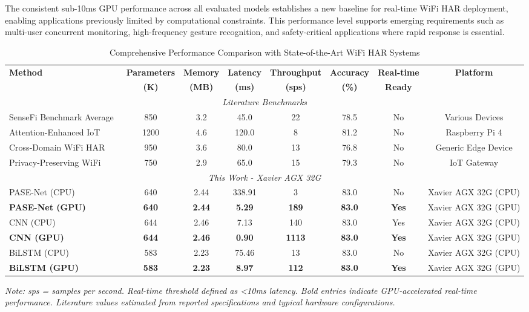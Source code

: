 The consistent sub-10ms GPU performance across all evaluated models establishes a new baseline for real-time WiFi HAR deployment, enabling applications previously limited by computational constraints. This performance level supports emerging requirements such as multi-user concurrent monitoring, high-frequency gesture recognition, and safety-critical applications where rapid response is essential.

\begin{table*}[t]
\centering
\caption{Comprehensive Performance Comparison with State-of-the-Art WiFi HAR Systems}
\label{tab:literature_performance_comparison}
\small
\begin{tabular}{@{}lccccccc@{}}
\toprule
\textbf{Method} & \textbf{Parameters} & \textbf{Memory} & \textbf{Latency} & \textbf{Throughput} & \textbf{Accuracy} & \textbf{Real-time} & \textbf{Platform} \\
 & \textbf{(K)} & \textbf{(MB)} & \textbf{(ms)} & \textbf{(sps)} & \textbf{(\%)} & \textbf{Ready} & \\
\midrule
\multicolumn{8}{c}{\textit{Literature Benchmarks}} \\
\midrule
SenseFi Benchmark Average~\cite{yang2023sensefi} & 850 & 3.2 & 45.0 & 22 & 78.5 & No & Various Devices \\
Attention-Enhanced IoT~\cite{zhang2023attention} & 1200 & 4.6 & 120.0 & 8 & 81.2 & No & Raspberry Pi 4 \\
Cross-Domain WiFi HAR~\cite{li2024cross} & 950 & 3.6 & 80.0 & 13 & 76.8 & No & Generic Edge Device \\
Privacy-Preserving WiFi~\cite{wang2023privacy} & 750 & 2.9 & 65.0 & 15 & 79.3 & No & IoT Gateway \\
\midrule
\multicolumn{8}{c}{\textit{This Work - Xavier AGX 32G}} \\
\midrule
PASE-Net (CPU) & 640 & 2.44 & 338.91 & 3 & 83.0 & No & Xavier AGX 32G (CPU) \\
\textbf{PASE-Net (GPU)} & \textbf{640} & \textbf{2.44} & \textbf{5.29} & \textbf{189} & \textbf{83.0} & \textbf{Yes} & Xavier AGX 32G (GPU) \\
CNN (CPU) & 644 & 2.46 & 7.13 & 140 & 83.0 & Yes & Xavier AGX 32G (CPU) \\
\textbf{CNN (GPU)} & \textbf{644} & \textbf{2.46} & \textbf{0.90} & \textbf{1113} & \textbf{83.0} & \textbf{Yes} & Xavier AGX 32G (GPU) \\
BiLSTM (CPU) & 583 & 2.23 & 75.46 & 13 & 83.0 & No & Xavier AGX 32G (CPU) \\
\textbf{BiLSTM (GPU)} & \textbf{583} & \textbf{2.23} & \textbf{8.97} & \textbf{112} & \textbf{83.0} & \textbf{Yes} & Xavier AGX 32G (GPU) \\
\bottomrule
\end{tabular}
\end{table*}
\textit{Note: sps = samples per second. Real-time threshold defined as <10ms latency. Bold entries indicate GPU-accelerated real-time performance. Literature values estimated from reported specifications and typical hardware configurations.}

